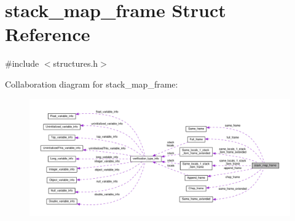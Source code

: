 \hypertarget{structstack__map__frame}{}\section{stack\+\_\+map\+\_\+frame Struct Reference}
\label{structstack__map__frame}


{\ttfamily \#include $<$structures.\+h$>$}



Collaboration diagram for stack\+\_\+map\+\_\+frame\+:
\nopagebreak
\begin{figure}[H]
\begin{center}
\leavevmode
\includegraphics[width=350pt]{structstack__map__frame__coll__graph}
\end{center}
\end{figure}
